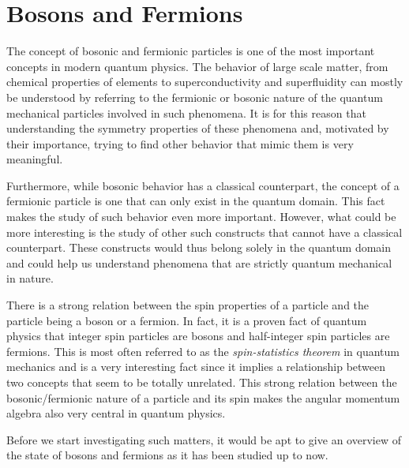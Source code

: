 \section{Bosons and Fermions}
The concept of bosonic and fermionic particles is one of the most important concepts
in modern quantum physics. The behavior of large scale matter, from chemical
properties of elements to superconductivity and superfluidity can mostly be
understood by referring to the fermionic or bosonic nature of the quantum
mechanical particles involved in such phenomena. It is for this reason that
understanding the symmetry properties of these phenomena and, motivated by their
importance, trying to find other behavior that mimic them is very meaningful.

Furthermore, while bosonic behavior has a classical counterpart, the
concept of a fermionic particle is one that can only exist in the quantum
domain. This fact makes the study of such behavior even more important.
However, what could be more interesting is the study of other such
constructs that cannot have a classical counterpart. These constructs would
thus belong solely in the quantum domain and could help us understand phenomena
that are strictly quantum mechanical in nature.

There is a strong relation between the spin properties of a particle and
the particle being a boson or a fermion. In fact, it is a proven fact of
quantum physics that integer spin particles are bosons and half-integer spin
particles are fermions. This is most often referred to as the {\it spin-statistics
theorem} in quantum mechanics and is a very interesting fact since it implies
a relationship between two concepts that seem to be totally unrelated. This
strong relation between the bosonic/fermionic nature of a particle and its spin
makes the angular momentum algebra also very central in quantum physics.

Before we start investigating such matters, it would be apt to give an
overview of the state of bosons and fermions as it has been studied up to now.

